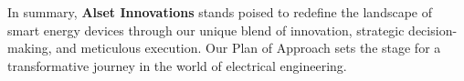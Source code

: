 In summary, \textbf{Alset Innovations} stands poised to redefine the landscape of smart energy devices through our unique blend of innovation, strategic decision-making, and meticulous execution. Our Plan of Approach sets the stage for a transformative journey in the world of electrical engineering.
